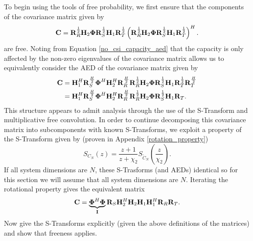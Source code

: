 To begin using the tools of free probability, we first ensure that the components of the covariance matrix given by 
	\begin{equation}
	\mathbf{C} = \mathbf{R}_{R}^{\frac{1}{2}}\mathbf{H}_{2}\boldsymbol{\Phi} \mathbf{R}_{S}^{\frac{1}{2}}\mathbf{H}_{1}\mathbf{R}_{T}^{\frac{1}{2}}
	\left(\mathbf{R}_{R}^{\frac{1}{2}}\mathbf{H}_{2}\boldsymbol{\Phi} \mathbf{R}_{S}^{\frac{1}{2}}\mathbf{H}_{1}\mathbf{R}_{T}^{\frac{1}{2}}\right)^H.
	\end{equation}
are free. 
Noting from Equation \eqref{no_csi_capacity_aed} that the capacity is only affected by the non-zero eigenvalues of the covariance matrix allows us to equivalently 
consider the AED of the covariance matrix given by 
	\begin{align}
	\mathbf{C} &  =  \mathbf{H}_{1}^H \mathbf{R}_{S}^{\frac{H}{2}}\boldsymbol{\Phi}^H \mathbf{H}_{2}^H \mathbf{R}_{R}^{\frac{H}{2}}
	 \mathbf{R}_{R}^{\frac{1}{2}}\mathbf{H}_{2}\boldsymbol{\Phi} \mathbf{R}_{S}^{\frac{1}{2}}\mathbf{H}_{1}\mathbf{R}_{T}^{\frac{1}{2}}\mathbf{R}_{T}^{\frac{H}{2}}
	 \\
	 &  =  
	 \mathbf{H}_{1}^H \mathbf{R}_{S}^{\frac{H}{2}}\boldsymbol{\Phi}^H \mathbf{H}_{2}^H \mathbf{R}_{R}^{\frac{H}{2}}
	 \mathbf{R}_{R}^{\frac{1}{2}}\mathbf{H}_{2}\boldsymbol{\Phi} \mathbf{R}_{S}^{\frac{1}{2}}\mathbf{H}_{1}\mathbf{R}_{T}.
	\end{align}
This structure appears to admit analysis through the use of the S-Transform and multiplicative free convolution. In order to continue decomposing this covariance matrix into subcomponents  with known S-Transforms, we exploit a property of the S-Transform given by (proven in Appendix \ref{rotation_property})
\begin{equation}
S_{C_N}(z) = \frac{z+1}{z+\chi_2} S_{\tilde{C}_N}(\frac{z}{\chi_2}).
\end{equation}
If all system dimensions are $N$, these S-Trasforms (and AEDs) identical so for this section we will assume that all system dimensions are $N$.
Iterating the rotational property gives the equivalent matrix
	\begin{equation}
	\mathbf{C} =
\underbrace{\boldsymbol{\Phi}^H \boldsymbol{\Phi}}_{\mathbf{I}}
	\mathbf{R}_{S}
	 \mathbf{H}_{2}^H \mathbf{H}_{2}
	 \mathbf{H}_{1}\mathbf{H}_{1}^H 
	  \mathbf{R}_{R}
	 \mathbf{R}_{T}.
	\end{equation}
Now give the S-Transforms explicitly (given the above definitions of the matrices) and show that freeness applies. 
